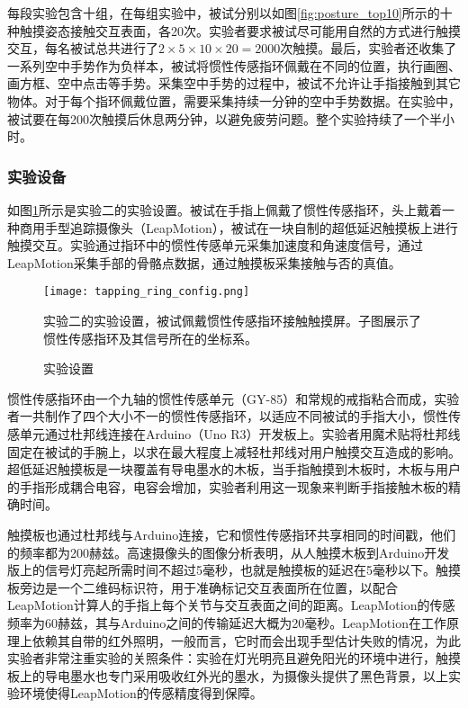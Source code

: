 每段实验包含十组，在每组实验中，被试分别以如图\ref{fig:posture_top10}所示的十种触摸姿态接触交互表面，各20次。实验者要求被试尽可能用自然的方式进行触摸交互，每名被试总共进行了$2\times5\times10\times20=2000$次触摸。最后，实验者还收集了一系列空中手势作为负样本，被试将惯性传感指环佩戴在不同的位置，执行画圈、画方框、空中点击等手势。采集空中手势的过程中，被试不允许让手指接触到其它物体。对于每个指环佩戴位置，需要采集持续一分钟的空中手势数据。在实验中，被试要在每200次触摸后休息两分钟，以避免疲劳问题。整个实验持续了一个半小时。

\subsubsection{实验设备}

如图\ref{fig:tapping_ring_config}所示是实验二的实验设置。被试在手指上佩戴了惯性传感指环，头上戴着一种商用手型追踪摄像头（LeapMotion），被试在一块自制的超低延迟触摸板上进行触摸交互。实验通过指环中的惯性传感单元采集加速度和角速度信号，通过LeapMotion采集手部的骨骼点数据，通过触摸板采集接触与否的真值。

\begin{figure}
	\centering
	\texttt{[image: tapping\_ring\_config.png]}
	\caption*{实验二的实验设置，被试佩戴惯性传感指环接触触摸屏。子图展示了惯性传感指环及其信号所在的坐标系。}
	\caption{实验设置}
	\label{fig:tapping_ring_config}
\end{figure}

惯性传感指环由一个九轴的惯性传感单元（GY-85）和常规的戒指粘合而成，实验者一共制作了四个大小不一的惯性传感指环，以适应不同被试的手指大小，惯性传感单元通过杜邦线连接在Arduino（Uno R3）开发板上。实验者用魔术贴将杜邦线固定在被试的手腕上，以求在最大程度上减轻杜邦线对用户触摸交互造成的影响。超低延迟触摸板是一块覆盖有导电墨水的木板，当手指触摸到木板时，木板与用户的手指形成耦合电容，电容会增加，实验者利用这一现象来判断手指接触木板的精确时间\cite{badger2018capacitive}。

触摸板也通过杜邦线与Arduino连接，它和惯性传感指环共享相同的时间戳，他们的频率都为200赫兹。高速摄像头的图像分析表明，从人触摸木板到Arduino开发版上的信号灯亮起所需时间不超过5毫秒，也就是触摸板的延迟在5毫秒以下。触摸板旁边是一个二维码标识符，用于准确标记交互表面所在位置，以配合LeapMotion计算人的手指上每个关节与交互表面之间的距离。LeapMotion的传感频率为60赫兹，其与Arduino之间的传输延迟大概为20毫秒。LeapMotion在工作原理上依赖其自带的红外照明，一般而言，它时而会出现手型估计失败的情况，为此实验者非常注重实验的关照条件：实验在灯光明亮且避免阳光的环境中进行，触摸板上的导电墨水也专门采用吸收红外光的墨水，为摄像头提供了黑色背景，以上实验环境使得LeapMotion的传感精度得到保障。

